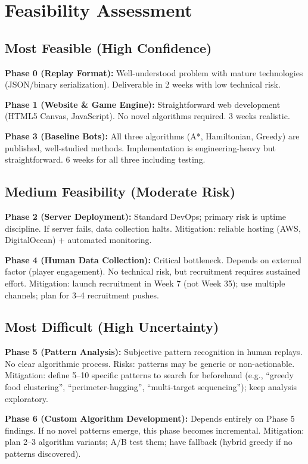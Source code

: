 \documentclass[a4paper]{article}
\begin{document}
\section{Feasibility Assessment}

\subsection{Most Feasible (High Confidence)}

\textbf{Phase 0 (Replay Format):} Well-understood problem with mature technologies (JSON/binary serialization). Deliverable in 2 weeks with low technical risk.

\textbf{Phase 1 (Website \& Game Engine):} Straightforward web development (HTML5 Canvas, JavaScript). No novel algorithms required. 3 weeks realistic.

\textbf{Phase 3 (Baseline Bots):} All three algorithms (A*, Hamiltonian, Greedy) are published, well-studied methods. Implementation is engineering-heavy but straightforward. 6 weeks for all three including testing.

\subsection{Medium Feasibility (Moderate Risk)}

\textbf{Phase 2 (Server Deployment):} Standard DevOps; primary risk is uptime discipline. If server fails, data collection halts. Mitigation: reliable hosting (AWS, DigitalOcean) + automated monitoring.

\textbf{Phase 4 (Human Data Collection):} Critical bottleneck. Depends on external factor (player engagement). No technical risk, but recruitment requires sustained effort. Mitigation: launch recruitment in Week 7 (not Week 35); use multiple channels; plan for 3--4 recruitment pushes.

\subsection{Most Difficult (High Uncertainty)}

\textbf{Phase 5 (Pattern Analysis):} Subjective pattern recognition in human replays. No clear algorithmic process. Risks: patterns may be generic or non-actionable. Mitigation: define 5--10 specific patterns to search for beforehand (e.g., ``greedy food clustering'', ``perimeter-hugging'', ``multi-target sequencing''); keep analysis exploratory.

\textbf{Phase 6 (Custom Algorithm Development):} Depends entirely on Phase 5 findings. If no novel patterns emerge, this phase becomes incremental. Mitigation: plan 2--3 algorithm variants; A/B test them; have fallback (hybrid greedy if no patterns discovered).
\end{document}
